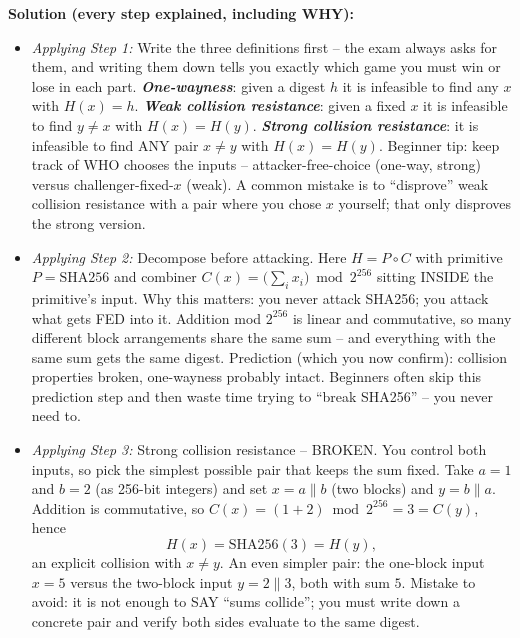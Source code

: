 \documentclass[12pt, a4paper]{article}
\newcommand{\term}[1]{\textbf{\textit{#1}}}        %
\begin{document}
\textbf{Solution (every step explained, including WHY):}
\begin{itemize}
    \item \textit{Applying Step 1:} Write the three definitions first -- the exam always asks for them, and writing them down tells you exactly which game you must win or lose in each part. \term{One-wayness}: given a digest $h$ it is infeasible to find any $x$ with $H(x) = h$. \term{Weak collision resistance}: given a fixed $x$ it is infeasible to find $y \neq x$ with $H(x) = H(y)$. \term{Strong collision resistance}: it is infeasible to find ANY pair $x \neq y$ with $H(x) = H(y)$. Beginner tip: keep track of WHO chooses the inputs -- attacker-free-choice (one-way, strong) versus challenger-fixed-$x$ (weak). A common mistake is to ``disprove'' weak collision resistance with a pair where you chose $x$ yourself; that only disproves the strong version.
    \item \textit{Applying Step 2:} Decompose before attacking. Here $H = P \circ C$ with primitive $P = \mathrm{SHA256}$ and combiner $C(x) = \big(\sum_i x_i\big) \bmod 2^{256}$ sitting INSIDE the primitive's input. Why this matters: you never attack SHA256; you attack what gets FED into it. Addition mod $2^{256}$ is linear and commutative, so many different block arrangements share the same sum -- and everything with the same sum gets the same digest. Prediction (which you now confirm): collision properties broken, one-wayness probably intact. Beginners often skip this prediction step and then waste time trying to ``break SHA256'' -- you never need to.
    \item \textit{Applying Step 3:} Strong collision resistance -- BROKEN. You control both inputs, so pick the simplest possible pair that keeps the sum fixed. Take $a = 1$ and $b = 2$ (as 256-bit integers) and set $x = a \| b$ (two blocks) and $y = b \| a$. Addition is commutative, so $C(x) = (1+2) \bmod 2^{256} = 3 = C(y)$, hence
\[ H(x) = \mathrm{SHA256}(3) = H(y), \]
an explicit collision with $x \neq y$. An even simpler pair: the one-block input $x = 5$ versus the two-block input $y = 2 \| 3$, both with sum $5$. Mistake to avoid: it is not enough to SAY ``sums collide''; you must write down a concrete pair and verify both sides evaluate to the same digest.

\end{itemize}
\end{document}
